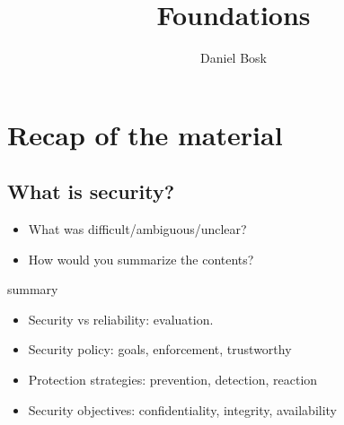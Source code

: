 \title{%
  Foundations
}
\author{Daniel Bosk}


\mode*

\section{Recap of the material}

\subsection{What is security?}

\begin{frame}
  \begin{question}
    \begin{itemize}
      \item What was difficult/ambiguous/unclear?
      \item How would you summarize the contents?
    \end{itemize}
  \end{question}
\end{frame}

\begin{frame}
  \begin{block}{summary}
    \begin{itemize}
      \item Security vs reliability: evaluation.

        \pause

      \item Security policy: goals, enforcement, trustworthy
        
        \pause

      \item Protection strategies: prevention, detection, reaction

        \pause

      \item Security objectives: confidentiality, integrity, availability
    \end{itemize}
  \end{block}
\end{frame}

